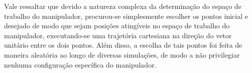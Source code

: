 Vale ressaltar que devido a natureza complexa da determinação do espaço 
de trabalho do manipulador, procurou-se simplesmente escolher 
os pontos inicial e desejado de modo que sejam posições atingíveis no espaço
de trabalho do manipulador, executando-se uma 
trajetória cartesiana na direção do vetor unitário entre os dois pontos.
Além disso, a escolha de tais pontos foi feita de maneira aleatória ao longo de 
diversas simulações, de modo a não privilegiar nenhuma configuração específica do 
manipulador.